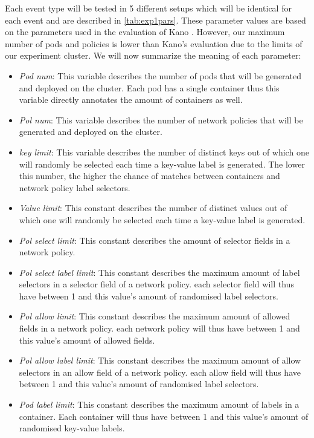 Each event type will be tested in 5 different setups which will be identical for each event and are described in \autoref{tab:exp1pars}. These parameter values are based on the parameters used in the evaluation of Kano \cite{kano}. However, our maximum number of pods and policies is lower than Kano's evaluation due to the limits of our experiment cluster. We will now summarize the meaning of each parameter:
\begin{itemize}
    \item \textit{Pod num}: This variable describes the number of pods that will be generated and deployed on the cluster. Each pod has a single container thus this variable directly annotates the amount of containers as well.
    \item \textit{Pol num}: This variable describes the number of network policies that will be generated and deployed on the cluster.
    \item \textit{key limit}: This variable describes the number of distinct keys out of which one will randomly be selected each time a key-value label is generated. The lower this number, the higher the chance of matches between containers and network policy label selectors.
    \item \textit{Value limit}: This constant describes the number of distinct values out of which one will randomly be selected each time a key-value label is generated.
    \item \textit{Pol select limit}: This constant describes the amount of selector fields in a network policy.
    \item \textit{Pol select label limit}: This constant describes the maximum amount of label selectors in a selector field of a network policy. each selector field will thus have between 1 and this value's amount of randomised label selectors.
    \item \textit{Pol allow limit}: This constant describes the maximum amount of allowed fields in a network policy. each network policy will thus have between 1 and this value's amount of allowed fields.
    \item \textit{Pol allow label limit}: This constant describes the maximum amount of allow selectors in an allow field of a network policy. each allow field will thus have between 1 and this value's amount of randomised label selectors.
     \item \textit{Pod label limit}: This constant describes the maximum amount of labels in a container. Each container will thus have between 1 and this value's amount of randomised key-value labels.
\end{itemize}

